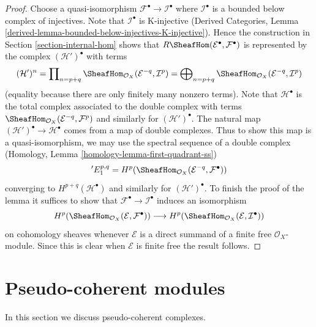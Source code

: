 \begin{proof}
Choose a quasi-isomorphism $\mathcal{F}^\bullet \to \mathcal{I}^\bullet$
where $\mathcal{I}^\bullet$ is a bounded below complex of injectives.
Note that $\mathcal{I}^\bullet$ is K-injective
(Derived Categories, Lemma
\ref{derived-lemma-bounded-below-injectives-K-injective}).
Hence the construction in Section \ref{section-internal-hom}
shows that
$R\SheafHom(\mathcal{E}^\bullet, \mathcal{F}^\bullet)$ is
represented by the complex $(\mathcal{H}')^\bullet$ with terms
$$
(\mathcal{H}')^n =
\prod\nolimits_{n = p + q}
\SheafHom_{\mathcal{O}_X}(\mathcal{E}^{-q}, \mathcal{I}^p) =
\bigoplus\nolimits_{n = p + q}
\SheafHom_{\mathcal{O}_X}(\mathcal{E}^{-q}, \mathcal{I}^p)
$$
(equality because there are only finitely many nonzero terms).
Note that $\mathcal{H}^\bullet$ is the total complex associated to
the double complex with terms
$\SheafHom_{\mathcal{O}_X}(\mathcal{E}^{-q}, \mathcal{F}^p)$
and similarly for $(\mathcal{H}')^\bullet$.
The natural map $(\mathcal{H}')^\bullet \to \mathcal{H}^\bullet$
comes from a map of double complexes.
Thus to show this map is a quasi-isomorphism, we may use the spectral
sequence of a double complex
(Homology, Lemma \ref{homology-lemma-first-quadrant-ss})
$$
{}'E_1^{p, q} =
H^p(\SheafHom_{\mathcal{O}_X}(\mathcal{E}^{-q}, \mathcal{F}^\bullet))
$$
converging to $H^{p + q}(\mathcal{H}^\bullet)$ and similarly for
$(\mathcal{H}')^\bullet$. To finish the proof of the lemma it
suffices to show that $\mathcal{F}^\bullet \to \mathcal{I}^\bullet$
induces an isomorphism
$$
H^p(\SheafHom_{\mathcal{O}_X}(\mathcal{E}, \mathcal{F}^\bullet))
\longrightarrow
H^p(\SheafHom_{\mathcal{O}_X}(\mathcal{E}, \mathcal{I}^\bullet))
$$
on cohomology sheaves whenever $\mathcal{E}$ is a direct summand of a
finite free $\mathcal{O}_X$-module. Since this is clear when $\mathcal{E}$
is finite free the result follows.
\end{proof}





\section{Pseudo-coherent modules}
\label{section-pseudo-coherent}

\noindent
In this section we discuss pseudo-coherent complexes.

